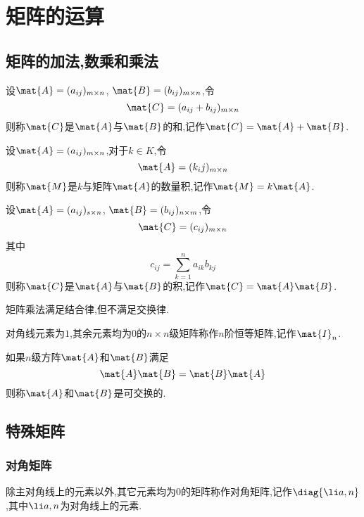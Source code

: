 \documentclass{ctexart}
\begin{document}
\section{矩阵的运算}
\subsection{矩阵的加法,数乘和乘法}
\begin{definition}[矩阵的加法]
    设$\mat{A}=(a_{ij})_{m\times n}$, $\mat{B}=(b_{ij})_{m\times n}$,令
    \[\mat{C}=(a_{ij}+b_{ij})_{m\times n}\]
    则称$\mat{C}$是$\mat{A}$与$\mat{B}$的和,记作$\mat{C}=\mat{A}+\mat{B}$.
\end{definition}
\begin{definition}[矩阵的数乘]
    设$\mat{A}=(a_{ij})_{m\times n}$,对于$k\in K$,令
    \[\mat{A}=(k_ij)_{m\times n}\]
    则称$\mat{M}$是$k$与矩阵$\mat{A}$的数量积,记作$\mat{M}=k\mat{A}$.
\end{definition}
\begin{definition}[矩阵的乘法]
    设$\mat{A}=(a_{ij})_{s\times n}$, $\mat{B}=(b_{ij})_{n\times m}$,令
    \[\mat{C}=(c_{ij})_{m\times n}\]
    其中
    \[c_{ij}=\sum_{k=1}^{n}a_{ik}b_{kj}\]
    则称$\mat{C}$是$\mat{A}$与$\mat{B}$的积,记作$\mat{C}=\mat{A}\mat{B}$.
\end{definition}
矩阵乘法满足结合律,但不满足交换律.
\begin{definition}[恒等矩阵]
    对角线元素为$1$,其余元素均为$0$的$n\times n$级矩阵称作$n$阶恒等矩阵,记作$\mat{I}_n$.
\end{definition}
\begin{definition}[可交换矩阵]
    如果$n$级方阵$\mat{A}$和$\mat{B}$满足
    \[\mat{A}\mat{B}=\mat{B}\mat{A}\]
    则称$\mat{A}$和$\mat{B}$是可交换的.
\end{definition}
\subsection{特殊矩阵}
\subsubsection{对角矩阵}
\begin{definition}[对角矩阵]
    除主对角线上的元素以外,其它元素均为$0$的矩阵称作对角矩阵,记作$\diag\{\li a,n\}$,其中$\li a,n$为对角线上的元素.
\end{definition}
\end{document}
